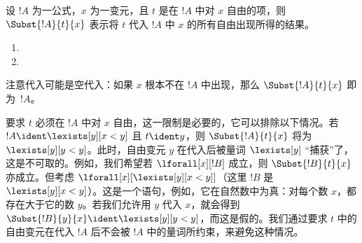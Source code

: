 \documentclass[../../../include/open-logic-section]{subfiles}
\begin{document}
\begin{defn}[公式中的代入]
设 $!A$ 为一公式，$x$ 为一变元，且 $t$ 是在 $!A$ 中对 $x$ 自由的项，则 $\Subst{!A}{t}{x}$ 表示将 $t$ 代入 $!A$ 中 $x$ 的所有自由出现所得的结果。
\begin{enumerate}


\item {}

\item {}







\end{enumerate}
\end{defn}

\begin{explain}
注意代入可能是空代入：如果 $x$ 根本不在 $!A$ 中出现，那么 $\Subst{!A}{t}{x}$ 即为~$!A$。

要求 $t$ 必须在 $!A$ 中对 $x$ 自由，这一限制是必要的，它可以排除以下情况。若 $!A \ident \lexists[y][x < y]$ 且 $t \ident y$，则 $\Subst{!A}{t}{x}$ 将为 $\lexists[y][y < y]$。此时，自由变元 $y$ 在代入后被量词 $\lexists[y]$ “捕获”了，这是不可取的。例如，我们希望若 $\lforall[x][!B]$ 成立，则 $\Subst{!B}{t}{x}$ 亦成立。但考虑 $\lforall[x][\lexists[y][x < y]]$（这里 $!B$ 是 $\lexists[y][x < y]$）。这是一个语句，例如，它在自然数中为真：对每个数 $x$，都存在大于它的数 $y$。若我们允许用 $y$ 代入 $x$，就会得到 $\Subst{!B}{y}{x} \ident \lexists[y][y < y]$，而这是假的。我们通过要求 $t$ 中的自由变元在代入 $!A$ 后不会被 $!A$ 中的量词所约束，来避免这种情况。
\end{explain}
\end{document}
